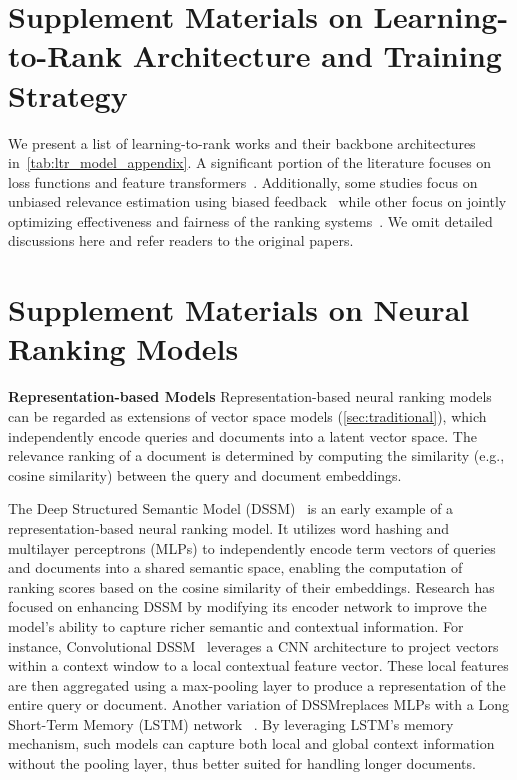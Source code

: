 \section{Supplement Materials on Learning-to-Rank Architecture and Training Strategy}
\label{appendix:ltr}

We present a list of learning-to-rank works and their backbone architectures in~\cref{tab:ltr_model_appendix}. 
A significant portion of the literature focuses on loss functions and feature transformers~\cite{qin2021neural,bruch2019revisiting,burges2010ranknet}. 
Additionally, some studies focus on unbiased relevance estimation using biased feedback~\cite{wang2016learning,joachims2017unbiased,joachims2017accurately,ai2018unbiased,ai2018dla,wang2018position,hu2019unbiased,ren2022unbiased}
while other focus on jointly optimizing effectiveness and fairness of the ranking systems~\cite{singh2018fairness,biega2018equity,morik2020controlling,patro2020fairrec,oosterhuis2021computationally,yang2023vertical,yang2023marginal,yang2023fara}.
We omit detailed discussions here and refer readers to the original papers. 




\section{Supplement Materials on Neural Ranking Models}
\label{appendix:neural_ranking}
\noindent \textbf{Representation-based Models} Representation-based neural ranking models can be regarded as extensions of vector space models (\cref{sec:traditional}), which independently encode queries and documents into a latent vector space. The relevance ranking of a document is determined by computing the similarity (e.g., cosine similarity) between the query and document embeddings.

The Deep Structured Semantic Model (\textsc{DSSM})~\citep{huang2013dssm} is an early example of a representation-based neural ranking model. It utilizes word hashing and multilayer perceptrons (MLPs) to independently encode term vectors of queries and documents into a shared semantic space, enabling the computation of ranking scores based on the cosine similarity of their embeddings. 
Research has focused on enhancing \textsc{DSSM} by modifying its encoder network to improve the model's ability to capture richer semantic and contextual information. For instance, Convolutional \textsc{DSSM}~\citep{shen2014cdssm} leverages a CNN architecture to project vectors within a context window to a local contextual feature vector. These local features are then aggregated using a max-pooling layer to produce a representation of the entire query or document. 
Another variation of \textsc{DSSM}replaces MLPs with a Long Short-Term Memory (LSTM) network~\citep{palangi2016deep,wan2016deep} . By leveraging LSTM's memory mechanism, such models can capture both local and global context information without the pooling layer, thus better suited for handling longer documents.\\

